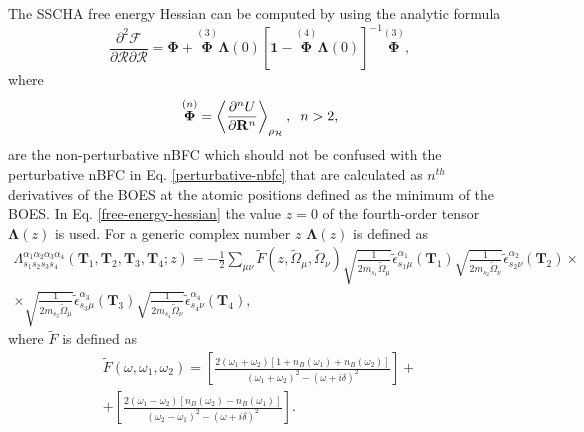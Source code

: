 The SSCHA free energy Hessian can be computed by using the analytic formula\cite{bianco2017second}
\begin{equation}
 \label{free-energy-hessian}
 \frac{\partial^{2}\mathcal{F}}{\partial\boldsymbol{\mathcal{R}}\partial\boldsymbol{\mathcal{R}}}=\boldsymbol{\Phi}+\overset{(3)}{\boldsymbol{\Phi}}\boldsymbol{\Lambda}(0)[\mathbf{1}-\overset{(4)}{\boldsymbol{
\Phi}}\boldsymbol{\Lambda}(0)]^{-1}\overset{(3)}{\boldsymbol{\Phi}},
\end{equation}
where 
\begin{equation}
 \overset{(n)}{\boldsymbol{\Phi}}=\left\langle\frac{\partial^{n}U}{\partial\mathbf{R}^{n}}\right\rangle_{\rho_{\mathcal{H}}}, \hspace{0.2cm} n>2,
\end{equation}
are the non-perturbative nBFC which should not be confused with the perturbative nBFC in Eq. \ref{perturbative-nbfc} that are calculated as $n^{th}$ derivatives of the BOES at the atomic positions defined as the minimum of 
the BOES. In Eq. \ref{free-energy-hessian} the value $z=0$ of the fourth-order tensor $\boldsymbol{\Lambda}(z)$ is used. For a generic complex number $z$ $\boldsymbol{\Lambda}(z)$ is defined as
\begin{multline}
 \Lambda_{s_{1}s_{2}s_{3}s_{4}}^{\alpha_{1}\alpha_{2}\alpha_{3}\alpha_{4}}(\mathbf{T}_{1},\mathbf{T}_{2},\mathbf{T}_{3},\mathbf{T}_{4};z)=-\frac{1}{2}\sum_{\mu\nu}\tilde{F}(z,\tilde{\Omega}_{\mu},\tilde{\Omega}_{\nu})\sqrt{\frac{
 1}{2m_{s_{1}}\tilde{\Omega}_{\mu}}}\tilde{\epsilon}_{s_{1}\mu}^{\alpha_{1}}(\mathbf{T}_{1})\sqrt{\frac{1}{2m_{s_{2}}\tilde{\Omega}_{\nu}}}\tilde{\epsilon}_{s_{2}\nu}^{\alpha_{2}}(\mathbf{T}_{2})\times\\\times\sqrt{\frac{1}{2m_{
 s_{3}}\tilde{\Omega}_{\mu}}}\tilde{\epsilon}_{s_{3}\mu}^{\alpha_{3}}(\mathbf{T}_{3})\sqrt{\frac{1}{2m_{s_{4}}\tilde{\Omega}_{\nu}}}\tilde{\epsilon}_{s_{4}\nu}^{\alpha_{4}}(\mathbf{T}_{4}),
\end{multline}
where $\tilde{F}$ is defined as 
\begin{multline}
 \tilde{F}(\omega,\omega_{1},\omega_{2})=\left[\frac{2(\omega_{1}+\omega_{2})[1+n_{B}(\omega_{1})+n_{B}(\omega_{2})]}{(\omega_{1}+\omega_{2})^{2}-(\omega+i\delta)^{2}}\right]+\\+\left[\frac{2(\omega_{1}-\omega_{2})[
 n_{B}(\omega_{2})-n_{B}(\omega_{1})]}{(\omega_{2}-\omega_{1})^{2}-(\omega+i\delta)^{2}}\right].
\end{multline}
\\

